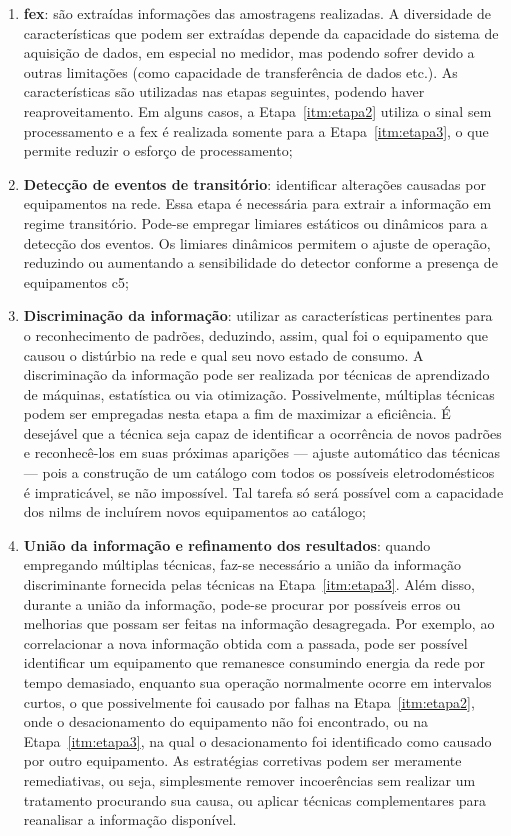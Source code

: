 \begin{enumerate}[label={Etapa} \arabic* - ,ref=\arabic*,align=left]
\item\label{itm:etapa1} \textbf{\gls{fex}}: são extraídas
informações das amostragens realizadas. A diversidade de
características que podem ser extraídas depende da capacidade do
sistema de aquisição de dados, em especial no medidor, mas podendo
sofrer devido a outras limitações (como capacidade de transferência de
dados etc.). As características são utilizadas nas etapas seguintes, podendo
haver reaproveitamento. Em alguns casos, a Etapa~\ref{itm:etapa2}
utiliza o sinal sem processamento e a \gls{fex} é realizada somente
para a Etapa~\ref{itm:etapa3}, o que permite reduzir o esforço de
processamento;
\item\label{itm:etapa2}\textbf{Detecção de eventos de transitório}:
identificar alterações causadas por equipamentos na rede. Essa etapa é
necessária para extrair a informação em regime transitório.
Pode-se empregar limiares estáticos ou dinâmicos para a detecção dos
eventos. Os limiares dinâmicos permitem o ajuste de operação,
reduzindo ou aumentando a sensibilidade do detector conforme a
presença de equipamentos \acs{c5};
\item\label{itm:etapa3}\textbf{Discriminação da informação}: utilizar as
características pertinentes para o reconhecimento de padrões,
deduzindo, assim, qual foi o equipamento que causou o distúrbio na rede
e qual seu novo estado de consumo. A discriminação da informação pode ser
realizada por técnicas de aprendizado de máquinas, estatística ou via
otimização. Possivelmente, múltiplas técnicas podem ser empregadas
nesta etapa a fim de maximizar a eficiência. É desejável que a técnica
seja capaz de identificar a ocorrência de novos padrões e
reconhecê-los em suas próximas aparições --- ajuste automático das
técnicas --- pois a construção de um catálogo com todos os possíveis
eletrodomésticos é impraticável, se não impossível. Tal tarefa só será
possível com a capacidade dos \glspl{nilm} de incluírem novos
equipamentos ao catálogo;
\item\label{itm:etapa4}\textbf{União da informação e refinamento dos
resultados}: quando empregando múltiplas técnicas, faz-se necessário a
união da informação discriminante fornecida pelas técnicas na
Etapa~\ref{itm:etapa3}. Além disso, durante a união da informação,
pode-se procurar por possíveis erros ou melhorias que possam ser
feitas na informação desagregada. Por exemplo, ao correlacionar a nova
informação obtida com a passada, pode ser possível identificar
um equipamento que remanesce consumindo energia da rede por
tempo demasiado, enquanto sua operação normalmente ocorre em
intervalos curtos, o que possivelmente foi causado por falhas na
Etapa~\ref{itm:etapa2}, onde o desacionamento do equipamento não foi
encontrado, ou na Etapa~\ref{itm:etapa3}, na qual o desacionamento foi
identificado como causado por outro equipamento. 
As estratégias corretivas podem ser meramente remediativas, ou seja,
simplesmente remover incoerências sem realizar um tratamento
procurando sua causa, ou aplicar técnicas complementares
para reanalisar a informação disponível.
\end{enumerate}


